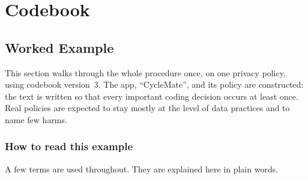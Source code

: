 \documentclass[twoside,its]{bossthesis}
\begin{document}
{}%
\sectionmark{\listfigurename}
\listoffigures
\cleardoublepage

{}%
\sectionmark{\listtablename}
\listoftables
\cleardoublepage

{}%
\sectionmark{\lstlistlistingname}
\lstlistoflistings
\cleardoublepage

{}%
\sectionmark{\bibname}
\printbibliography[title={\bibname}]
\cleardoublepage

\pagestyle{fancy}
\appendix

\chapter{Codebook}
\label{app:codebook}

\section{Worked Example}
\label{app:worked-example}

This section walks through the whole procedure once, on one privacy policy,
using codebook version~3. The app, \enquote{CycleMate}, and its policy are
constructed: the text is written so that every important coding decision
occurs at least once. Real policies are expected to stay mostly at the level
of data practices and to name few harms.

\subsection*{How to read this example}

A few terms are used throughout. They are explained here in plain words.
\end{document}
